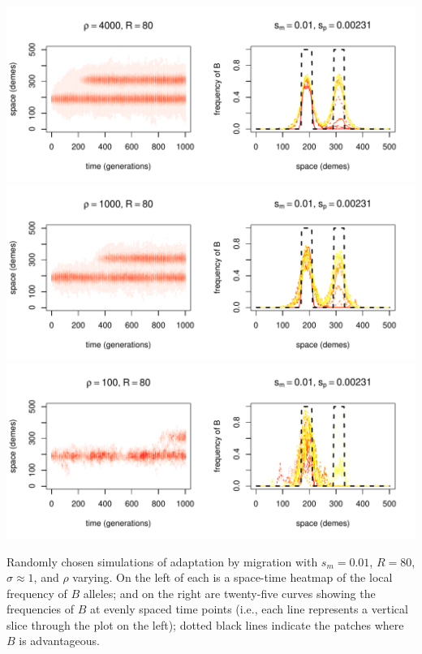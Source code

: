 \documentclass{article}
\begin{document}
\begin{sfigure}
  \begin{center}
    \includegraphics{example-migration-sims/42080-r1-501-sb0_01-sm-0_01-N4000-pophistory-run}
    \includegraphics{example-migration-sims/82698-r1-501-sb0_01-sm-0_01-N1000-pophistory-run}
    \includegraphics{example-migration-sims/97545-r1-501-sb0_01-sm-0_01-N100-pophistory-run}
  \end{center}
  \caption{
    Randomly chosen simulations of adaptation by migration
    with $s_m=0.01$, $R=80$, $\sigma\approx 1$, and $\rho$ varying.
    On the left of each is a space-time heatmap of the local frequency of $B$ alleles;
    and on the right are twenty-five curves showing the frequencies of $B$ at evenly spaced time points
    (i.e., each line represents a vertical slice through the plot on the left);
    dotted black lines indicate the patches where $B$ is advantageous.
  } \label{sfig:sims_6}
\end{sfigure}
\end{document}
